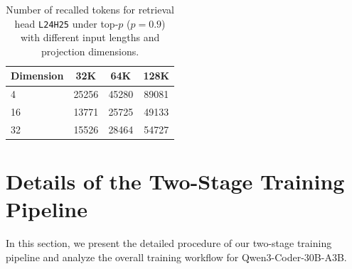 \begin{table}[ht]
    \centering
    \small
    \caption{Number of recalled tokens for retrieval head \texttt{L24H25} under top-$p$ ($p=0.9$) with different input lengths and projection dimensions.}
    \label{tab:appendix_l24h25_lowdim_topp_tokens}
    \begin{tabular}{lccc}
        \toprule
        \textbf{Dimension} & \textbf{32K} & \textbf{64K} & \textbf{128K} \\
        \midrule
        4  & 25256 & 45280 & 89081 \\
        16 & 13771 & 25725 & 49133 \\
        32 & 15526 & 28464 & 54727 \\
        \bottomrule
    \end{tabular}
\end{table}




\section{Details of the Two-Stage Training Pipeline}
\label{appd:training}

In this section, we present the detailed procedure of our two-stage training pipeline and analyze the overall training workflow for Qwen3-Coder-30B-A3B.

